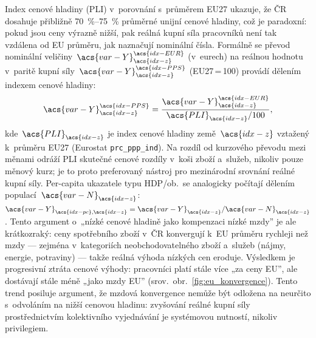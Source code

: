Index cenové hladiny (\ac{PLI}) v~porovnání s~průměrem EU27 ukazuje, že ČR dosahuje přibližně \SIrange{70}{75}{\percent} průměrné unijní cenové hladiny, což je paradoxní: pokud jsou ceny výrazně nižší, pak reálná kupní síla pracovníků není tak vzdálena od \ac{EU} průměru, jak naznačují nominální čísla.
Formálně se převod nominální veličiny~$\acs{var-Y}^{\acs{idx-EUR}}_{\acs{idx-z}}$ (v~eurech) na reálnou hodnotu v~paritě kupní síly~$\acs{var-Y}^{\acs{idx-PPS}}_{\acs{idx-z}}$ (\acs{EU}27\,=\,100) provádí dělením indexem cenové hladiny:
\begin{equation}\label{eq:eur_to_pps}
  \acs{var-Y}^{\acs{idx-PPS}}_{\acs{idx-z}}
    = \frac{\acs{var-Y}^{\acs{idx-EUR}}_{\acs{idx-z}}}
           {\acs{PLI}_{\acs{idx-z}} / 100},
\end{equation}
kde~$\acs{PLI}_{\acs{idx-z}}$ je index cenové hladiny země~$\acs{idx-z}$ vztažený k~průměru \acs{EU}27 (Eurostat \texttt{prc\_ppp\_ind}).
Na rozdíl od kurzového převodu mezi měnami odráží \ac{PLI} skutečné cenové rozdíly v~koši zboží a~služeb, nikoliv pouze měnový kurz; je to proto preferovaný nástroj pro mezinárodní srovnání reálné kupní síly.
Per-capita ukazatele typu \ac{HDP}/ob.\ se analogicky počítají dělením populací~$\acs{var-N}_{\acs{idx-z}}$:
$\acs{var-Y}_{\acs{idx-pc},\acs{idx-z}} = \acs{var-Y}_{\acs{idx-z}} / \acs{var-N}_{\acs{idx-z}}$.
Tento argument o~„nízké cenové hladině jako kompenzaci nízké mzdy” je ale krátkozraký: ceny spotřebního zboží v~ČR konvergují k~\ac{EU} průměru rychleji než mzdy --- zejména v~kategoriích neobchodovatelného zboží a~služeb (nájmy, energie, potraviny) --- takže reálná výhoda nízkých cen eroduje.
Výsledkem je progresivní ztráta cenové výhody: pracovníci platí stále více „za ceny \ac{EU}”, ale dostávají stále méně „jako mzdy \ac{EU}” (srov.~obr.~\ref{fig:eu_konvergence}).
Tento trend posiluje argument, že mzdová konvergence nemůže být odložena na neurčito s~odvoláním na nižší cenovou hladinu: zvyšování reálné kupní síly prostřednictvím kolektivního vyjednávání je systémovou nutností, nikoliv privilegiem.


